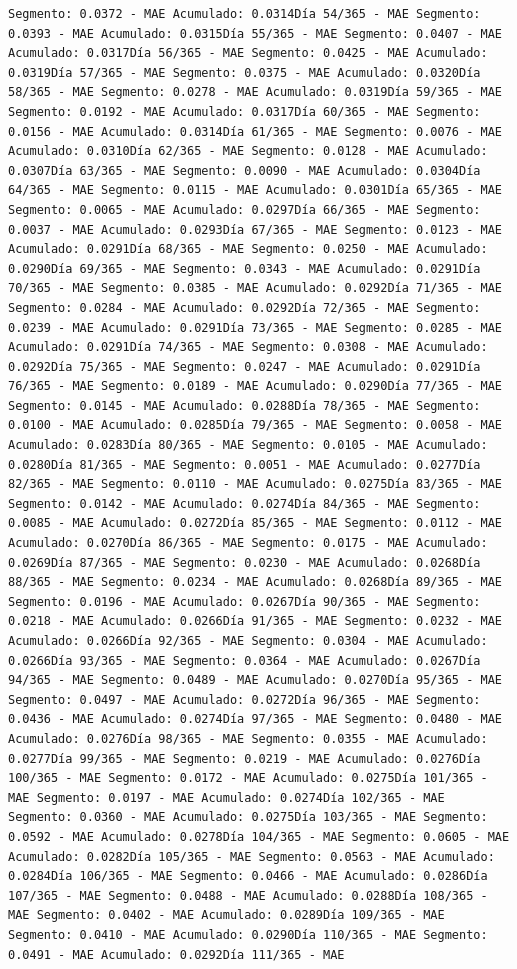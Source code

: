 \documentclass[
]{book}
\begin{document}
\begin{verbatim}
Segmento: 0.0372 - MAE Acumulado: 0.0314Día 54/365 - MAE Segmento: 0.0393 - MAE Acumulado: 0.0315Día 55/365 - MAE Segmento: 0.0407 - MAE Acumulado: 0.0317Día 56/365 - MAE Segmento: 0.0425 - MAE Acumulado: 0.0319Día 57/365 - MAE Segmento: 0.0375 - MAE Acumulado: 0.0320Día 58/365 - MAE Segmento: 0.0278 - MAE Acumulado: 0.0319Día 59/365 - MAE Segmento: 0.0192 - MAE Acumulado: 0.0317Día 60/365 - MAE Segmento: 0.0156 - MAE Acumulado: 0.0314Día 61/365 - MAE Segmento: 0.0076 - MAE Acumulado: 0.0310Día 62/365 - MAE Segmento: 0.0128 - MAE Acumulado: 0.0307Día 63/365 - MAE Segmento: 0.0090 - MAE Acumulado: 0.0304Día 64/365 - MAE Segmento: 0.0115 - MAE Acumulado: 0.0301Día 65/365 - MAE Segmento: 0.0065 - MAE Acumulado: 0.0297Día 66/365 - MAE Segmento: 0.0037 - MAE Acumulado: 0.0293Día 67/365 - MAE Segmento: 0.0123 - MAE Acumulado: 0.0291Día 68/365 - MAE Segmento: 0.0250 - MAE Acumulado: 0.0290Día 69/365 - MAE Segmento: 0.0343 - MAE Acumulado: 0.0291Día 70/365 - MAE Segmento: 0.0385 - MAE Acumulado: 0.0292Día 71/365 - MAE Segmento: 0.0284 - MAE Acumulado: 0.0292Día 72/365 - MAE Segmento: 0.0239 - MAE Acumulado: 0.0291Día 73/365 - MAE Segmento: 0.0285 - MAE Acumulado: 0.0291Día 74/365 - MAE Segmento: 0.0308 - MAE Acumulado: 0.0292Día 75/365 - MAE Segmento: 0.0247 - MAE Acumulado: 0.0291Día 76/365 - MAE Segmento: 0.0189 - MAE Acumulado: 0.0290Día 77/365 - MAE Segmento: 0.0145 - MAE Acumulado: 0.0288Día 78/365 - MAE Segmento: 0.0100 - MAE Acumulado: 0.0285Día 79/365 - MAE Segmento: 0.0058 - MAE Acumulado: 0.0283Día 80/365 - MAE Segmento: 0.0105 - MAE Acumulado: 0.0280Día 81/365 - MAE Segmento: 0.0051 - MAE Acumulado: 0.0277Día 82/365 - MAE Segmento: 0.0110 - MAE Acumulado: 0.0275Día 83/365 - MAE Segmento: 0.0142 - MAE Acumulado: 0.0274Día 84/365 - MAE Segmento: 0.0085 - MAE Acumulado: 0.0272Día 85/365 - MAE Segmento: 0.0112 - MAE Acumulado: 0.0270Día 86/365 - MAE Segmento: 0.0175 - MAE Acumulado: 0.0269Día 87/365 - MAE Segmento: 0.0230 - MAE Acumulado: 0.0268Día 88/365 - MAE Segmento: 0.0234 - MAE Acumulado: 0.0268Día 89/365 - MAE Segmento: 0.0196 - MAE Acumulado: 0.0267Día 90/365 - MAE Segmento: 0.0218 - MAE Acumulado: 0.0266Día 91/365 - MAE Segmento: 0.0232 - MAE Acumulado: 0.0266Día 92/365 - MAE Segmento: 0.0304 - MAE Acumulado: 0.0266Día 93/365 - MAE Segmento: 0.0364 - MAE Acumulado: 0.0267Día 94/365 - MAE Segmento: 0.0489 - MAE Acumulado: 0.0270Día 95/365 - MAE Segmento: 0.0497 - MAE Acumulado: 0.0272Día 96/365 - MAE Segmento: 0.0436 - MAE Acumulado: 0.0274Día 97/365 - MAE Segmento: 0.0480 - MAE Acumulado: 0.0276Día 98/365 - MAE Segmento: 0.0355 - MAE Acumulado: 0.0277Día 99/365 - MAE Segmento: 0.0219 - MAE Acumulado: 0.0276Día 100/365 - MAE Segmento: 0.0172 - MAE Acumulado: 0.0275Día 101/365 - MAE Segmento: 0.0197 - MAE Acumulado: 0.0274Día 102/365 - MAE Segmento: 0.0360 - MAE Acumulado: 0.0275Día 103/365 - MAE Segmento: 0.0592 - MAE Acumulado: 0.0278Día 104/365 - MAE Segmento: 0.0605 - MAE Acumulado: 0.0282Día 105/365 - MAE Segmento: 0.0563 - MAE Acumulado: 0.0284Día 106/365 - MAE Segmento: 0.0466 - MAE Acumulado: 0.0286Día 107/365 - MAE Segmento: 0.0488 - MAE Acumulado: 0.0288Día 108/365 - MAE Segmento: 0.0402 - MAE Acumulado: 0.0289Día 109/365 - MAE Segmento: 0.0410 - MAE Acumulado: 0.0290Día 110/365 - MAE Segmento: 0.0491 - MAE Acumulado: 0.0292Día 111/365 - MAE 
\end{verbatim}
\end{document}
